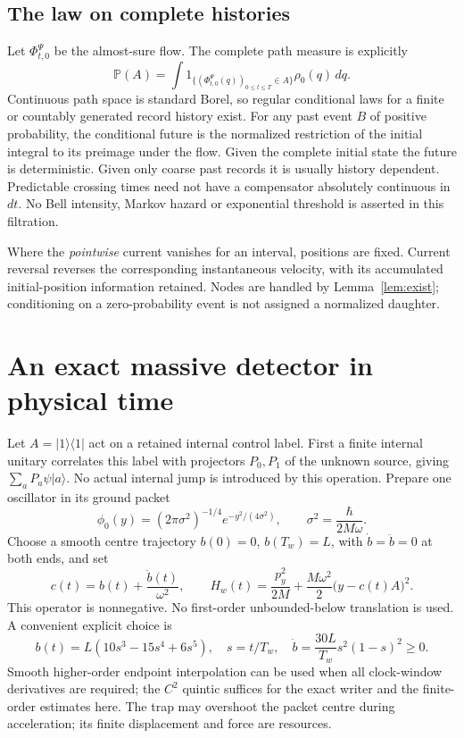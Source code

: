 \documentclass[11pt]{article}
\theoremstyle{definition}\newtheorem{assumption}[theorem]{Constitutive assumption}
\theoremstyle{remark}\newtheorem{remark}[theorem]{Remark}
\newcommand{\ket}[1]{|#1\rangle}\newcommand{\bra}[1]{\langle#1|}
\newcommand{\Prb}{\mathbb P}\newcommand{\TV}{d_{\rm TV}}
\begin{document}
\subsection{The law on complete histories}
Let $\Phi_{t,0}^\Psi$ be the almost-sure flow. The complete path measure is explicitly
\begin{equation}\label{eq:pathlaw}
 \Prb(A)=\int 1_{\{(\Phi_{t,0}^\Psi(q))_{0\le t\le T}\in A\}}
                   \rho_0(q)\,dq .
\end{equation}
Continuous path space is standard Borel, so regular conditional laws for a finite or countably generated record history exist. For any past event $B$ of positive probability, the conditional future is the normalized restriction of the initial integral to its preimage under the flow. Given the complete initial state the future is deterministic. Given only coarse past records it is usually history dependent. Predictable crossing times need not have a compensator absolutely continuous in $dt$. No Bell intensity, Markov hazard or exponential threshold is asserted in this filtration.

Where the \emph{pointwise} current vanishes for an interval, positions are fixed. Current reversal reverses the corresponding instantaneous velocity, with its accumulated initial-position information retained. Nodes are handled by Lemma~\ref{lem:exist}; conditioning on a zero-probability event is not assigned a normalized daughter.

\section{An exact massive detector in physical time}
\label{sec:detector}
Let $A=\ket{1}\bra{1}$ act on a retained internal control label. First a finite internal unitary correlates this label with projectors $P_0,P_1$ of the unknown source, giving $\sum_a P_a\psi\ket a$. No actual internal jump is introduced by this operation. Prepare one oscillator in its ground packet
\[
 \phi_0(y)=(2\pi\sigma^2)^{-1/4}e^{-y^2/(4\sigma^2)},\qquad
 \sigma^2=\frac{\hbar}{2M\omega}.
\]
Choose a smooth centre trajectory $b(0)=0$, $b(T_w)=L$, with $\dot b=\ddot b=0$ at both ends, and set
\begin{equation}\label{eq:force}
 c(t)=b(t)+\frac{\ddot b(t)}{\omega^2},\qquad
 H_w(t)=\frac{p_y^2}{2M}+\frac{M\omega^2}{2}\bigl(y-c(t)A\bigr)^2.
\end{equation}
This operator is nonnegative. No first-order unbounded-below translation is used. A convenient explicit choice is
\begin{equation}\label{eq:quintic}
 b(t)=L(10s^3-15s^4+6s^5),\quad s=t/T_w,\quad
 \dot b=\frac{30L}{T_w}s^2(1-s)^2\ge0.
\end{equation}
Smooth higher-order endpoint interpolation can be used when all clock-window derivatives are required; the $C^2$ quintic suffices for the exact writer and the finite-order estimates here. The trap may overshoot the packet centre during acceleration; its finite displacement and force are resources.
\end{document}
